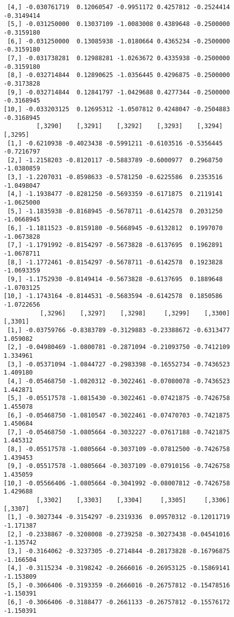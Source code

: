 \documentclass[
  letterpaper,
  DIV=11,
  numbers=noendperiod]{scrreprt}
\begin{document}
\begin{verbatim}
 [4,] -0.030761719  0.12060547 -0.9951172 0.4257812 -0.2524414 -0.3149414
 [5,] -0.031250000  0.13037109 -1.0083008 0.4389648 -0.2500000 -0.3159180
 [6,] -0.031250000  0.13085938 -1.0180664 0.4365234 -0.2500000 -0.3159180
 [7,] -0.031738281  0.12988281 -1.0263672 0.4335938 -0.2500000 -0.3159180
 [8,] -0.032714844  0.12890625 -1.0356445 0.4296875 -0.2500000 -0.3173828
 [9,] -0.032714844  0.12841797 -1.0429688 0.4277344 -0.2500000 -0.3168945
[10,] -0.033203125  0.12695312 -1.0507812 0.4248047 -0.2504883 -0.3168945
         [,3290]    [,3291]    [,3292]    [,3293]    [,3294]    [,3295]
 [1,] -0.6210938 -0.4023438 -0.5991211 -0.6103516 -0.5356445 -0.7216797
 [2,] -1.2158203 -0.8120117 -0.5883789 -0.6000977  0.2968750 -1.0380859
 [3,] -1.2207031 -0.8598633 -0.5781250 -0.6225586  0.2353516 -1.0498047
 [4,] -1.1938477 -0.8281250 -0.5693359 -0.6171875  0.2119141 -1.0625000
 [5,] -1.1835938 -0.8168945 -0.5678711 -0.6142578  0.2031250 -1.0668945
 [6,] -1.1811523 -0.8159180 -0.5668945 -0.6132812  0.1997070 -1.0673828
 [7,] -1.1791992 -0.8154297 -0.5673828 -0.6137695  0.1962891 -1.0678711
 [8,] -1.1772461 -0.8154297 -0.5678711 -0.6142578  0.1923828 -1.0693359
 [9,] -1.1752930 -0.8149414 -0.5673828 -0.6137695  0.1889648 -1.0703125
[10,] -1.1743164 -0.8144531 -0.5683594 -0.6142578  0.1850586 -1.0722656
          [,3296]    [,3297]    [,3298]     [,3299]    [,3300]  [,3301]
 [1,] -0.03759766 -0.8383789 -0.3129883 -0.23388672 -0.6313477 1.059082
 [2,] -0.04980469 -1.0800781 -0.2871094 -0.21093750 -0.7412109 1.334961
 [3,] -0.05371094 -1.0844727 -0.2983398 -0.16552734 -0.7436523 1.409180
 [4,] -0.05468750 -1.0820312 -0.3022461 -0.07080078 -0.7436523 1.442871
 [5,] -0.05517578 -1.0815430 -0.3022461 -0.07421875 -0.7426758 1.455078
 [6,] -0.05468750 -1.0810547 -0.3022461 -0.07470703 -0.7421875 1.450684
 [7,] -0.05468750 -1.0805664 -0.3032227 -0.07617188 -0.7421875 1.445312
 [8,] -0.05517578 -1.0805664 -0.3037109 -0.07812500 -0.7426758 1.439453
 [9,] -0.05517578 -1.0805664 -0.3037109 -0.07910156 -0.7426758 1.435059
[10,] -0.05566406 -1.0805664 -0.3041992 -0.08007812 -0.7426758 1.429688
         [,3302]    [,3303]    [,3304]     [,3305]     [,3306]   [,3307]
 [1,] -0.3027344 -0.3154297 -0.2319336  0.09570312 -0.12011719 -1.171387
 [2,] -0.2338867 -0.3208008 -0.2739258 -0.30273438 -0.04541016 -1.135742
 [3,] -0.3164062 -0.3237305 -0.2714844 -0.28173828 -0.16796875 -1.166504
 [4,] -0.3115234 -0.3198242 -0.2666016 -0.26953125 -0.15869141 -1.153809
 [5,] -0.3066406 -0.3193359 -0.2666016 -0.26757812 -0.15478516 -1.150391
 [6,] -0.3066406 -0.3188477 -0.2661133 -0.26757812 -0.15576172 -1.150391

\end{verbatim}
\end{document}
